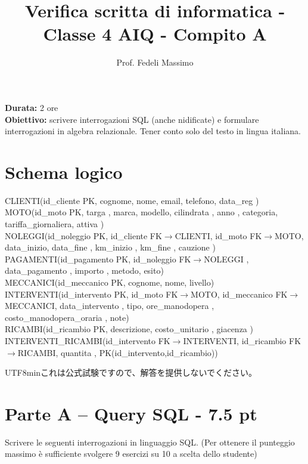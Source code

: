 \documentclass[a4paper,12pt]{article}
\title{Verifica scritta di informatica - Classe 4 AIQ - Compito A}
\author{Prof. Fedeli Massimo}
\date{}
\begin{document}
	\maketitle
	
	\textbf{Durata:} 2 ore \\
	\textbf{Obiettivo:} scrivere interrogazioni SQL (anche nidificate) e formulare interrogazioni in algebra relazionale. Tener conto solo del testo in lingua italiana.
	
	\section*{Schema logico}
	
	\begin{flushleft}
		CLIENTI(id\_cliente PK, cognome, nome, email, telefono, data\_reg ) \\
		MOTO(id\_moto PK, targa , marca, modello, cilindrata , anno , categoria, tariffa\_giornaliera, attiva ) \\
		NOLEGGI(id\_noleggio PK, id\_cliente FK$\rightarrow$CLIENTI, id\_moto FK$\rightarrow$MOTO, data\_inizio, data\_fine , km\_inizio , km\_fine , cauzione ) \\
		PAGAMENTI(id\_pagamento PK, id\_noleggio FK$\rightarrow$NOLEGGI , data\_pagamento , importo , metodo, esito) \\
		MECCANICI(id\_meccanico PK, cognome, nome, livello) \\
		INTERVENTI(id\_intervento PK, id\_moto FK$\rightarrow$MOTO, id\_meccanico FK$\rightarrow$MECCANICI, data\_intervento , tipo, ore\_manodopera , costo\_manodopera\_oraria , note) \\
		RICAMBI(id\_ricambio PK, descrizione, costo\_unitario , giacenza ) \\
		INTERVENTI\_RICAMBI(id\_intervento FK$\rightarrow$INTERVENTI, id\_ricambio FK$\rightarrow$RICAMBI, quantita , PK(id\_intervento,id\_ricambio))
	\end{flushleft}
	
	\begin{CJK}{UTF8}{min}これは公式試験ですので、解答を提供しないでください。\end{CJK}
	
	\section*{Parte A -- Query SQL - 7.5 pt}
	
	Scrivere le seguenti interrogazioni in linguaggio SQL. (Per ottenere il punteggio massimo è sufficiente svolgere 9 esercizi su 10 a scelta dello studente)
	
\end{document}

